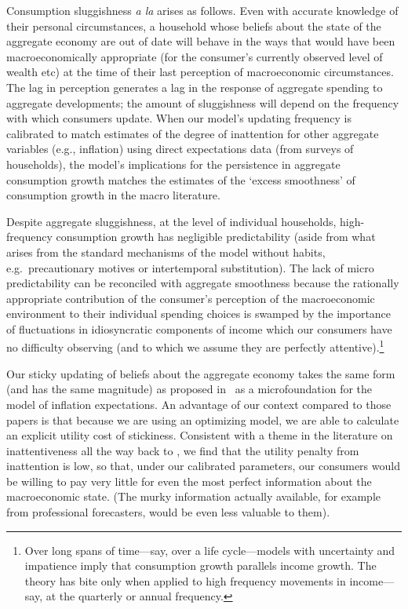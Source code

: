 \documentclass[titlepage]{\econtex}\newcommand{\texname}{cAndCwithStickyE}
\begin{document}
Consumption sluggishness {\it a la} \cite{cdSmooth} arises as follows.  Even with accurate knowledge of their personal circumstances, a household whose beliefs about the state of the aggregate economy are out of date will behave in the ways that would have been macroeconomically appropriate (for the consumer's currently observed level of wealth etc) at the time of their last perception of macroeconomic circumstances.  The lag in perception generates a lag in the response of aggregate spending to aggregate developments; the amount of sluggishness will depend on the frequency with which consumers update.  When our model's updating frequency is calibrated to match estimates of the degree of inattention for other aggregate variables (e.g., inflation) using direct expectations data (from surveys of households), the model's implications for the persistence in aggregate consumption growth matches the estimates of the `excess smoothness' of consumption growth in the macro literature.

Despite aggregate sluggishness, at the level of individual households, high-frequency consumption growth has negligible predictability (aside from what arises from the standard mechanisms of the model without habits, e.g.\ precautionary motives or intertemporal substitution).  The lack of micro predictability can be reconciled with aggregate smoothness because the rationally appropriate contribution of the consumer's perception of the macroeconomic environment to their individual spending choices is swamped by the importance of fluctuations in idiosyncratic components of income which our consumers have no difficulty observing (and to which we assume they are perfectly attentive).\footnote{Over long spans of time---say, over a life cycle---models with uncertainty and impatience imply that consumption growth parallels income growth.  The theory has bite only when applied to high frequency movements in income---say, at the quarterly or annual frequency.}

Our sticky updating of beliefs about the aggregate economy takes the same form (and has the same magnitude) as proposed in~\cite{carroll:epidemicinflQJE} as a microfoundation for the~\cite{mrSlumps} model of inflation expectations.  An advantage of our context compared to those papers is that because we are using an optimizing model, we are able to calculate an explicit utility cost of stickiness.  Consistent with a theme in the literature on inattentiveness all the way back to \cite{ayNearRational}, we find that the utility penalty from inattention is low, so that, under our calibrated parameters, our consumers would be willing to pay very little for even the most perfect information about the macroeconomic state.  (The murky information actually available, for example from professional forecasters, would be even less valuable to them).
\end{document}

